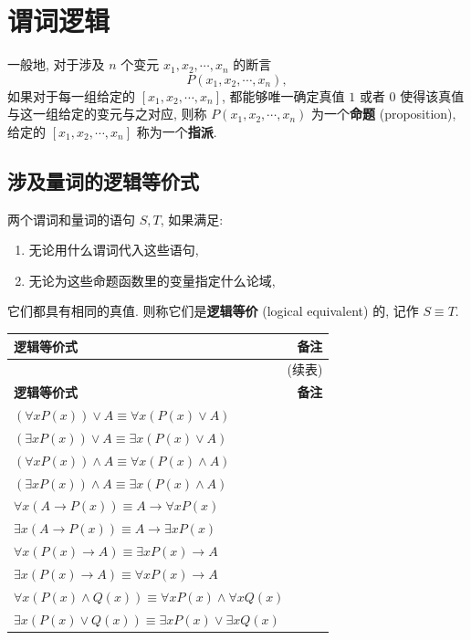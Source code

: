 \documentclass[10pt,UTF8]{book} %
\begin{document}
\section{谓词逻辑}

一般地, 对于涉及 $n$ 个变元 $x_1,x_2,\cdots, x_n$ 的断言
\[ P(x_1,x_2,\cdots,x_n), \]
如果对于每一组给定的 $[x_1,x_2,\cdots,x_n]$, 都能够唯一确定真值 $1$ 或者 $0$
使得该真值与这一组给定的变元与之对应, 则称 $P(x_1,x_2,\cdots,x_n)$ 为一个\textbf{命题}
(proposition),
给定的 $[x_1,x_2,\cdots,x_n]$ 称为一个\textbf{指派}.



\newpage
\subsection{涉及量词的逻辑等价式}

\begin{definition}
    两个谓词和量词的语句 $S,T$, 如果满足:
    \begin{enumerate}[label={${\arabic*}^\circ$}, itemsep=0pt]
        \item 无论用什么谓词代入这些语句,
        \item 无论为这些命题函数里的变量指定什么论域,
    \end{enumerate}
    它们都具有相同的真值. 则称它们是\textbf{逻辑等价} (logical equivalent) 的,
    记作 $S \equiv T$.
\end{definition}

{
\begin{longtable}{p{}p{}}
    \toprule 
    \textbf{逻辑等价式} & \textbf{备注} \\ 
    \midrule
    \endfirsthead
    \multicolumn{2}{r}{(续表)} \\
    \toprule 
    \textbf{逻辑等价式} & \textbf{备注} \\ 
    \midrule
    \endhead

    \bottomrule
    \endfoot

    $(\forall x P(x)) \vee A \equiv \forall x \left(
        P(x) \vee A
    \right)$ & \\
    $(\exists x P(x)) \vee A \equiv \exists x \left(
        P(x) \vee A
    \right)$ \\ 
    $(\forall x P(x)) \wedge A \equiv \forall x \left(
        P(x) \wedge A
    \right)$ & \\
    $(\exists x P(x)) \wedge A \equiv \exists x \left(
        P(x) \wedge A
    \right)$ \\ 
    $\forall x \left( A \to P(x) \right) \equiv A \to \forall x P(x)$ \\ 
    $\exists x \left( A \to P(x) \right) \equiv A \to \exists x P(x)$ \\ 
    $\forall x \left( P(x) \to A \right) \equiv \exists x P(x) \to A$ \\ 
    $\exists x \left( P(x) \to A \right) \equiv \forall x P(x) \to A$ \\ 
    $\forall x \left( P(x) \wedge Q(x) \right) \equiv
    \forall x P(x) \wedge \forall x Q(x)$ \\ 
    $\exists x \left( P(x) \vee Q(x) \right) \equiv
    \exists x P(x) \vee \exists x Q(x)$
\end{longtable}}
\end{document}

